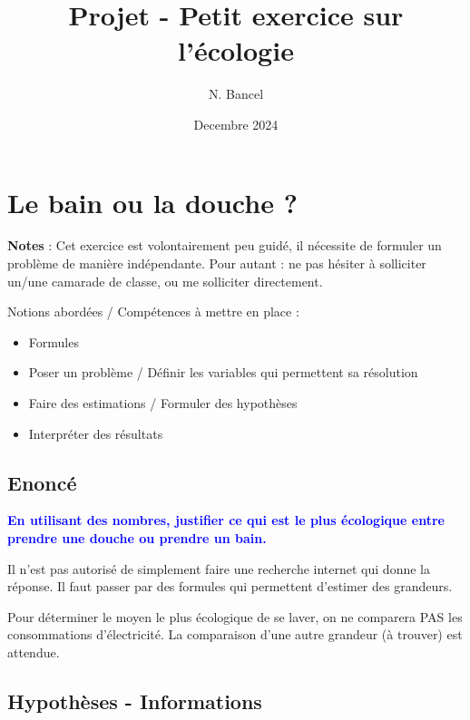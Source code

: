 \documentclass[a4paper,12pt]{article}
\begin{document}
\title{Projet - Petit exercice sur l'écologie}
\author{N. Bancel}
\date{Decembre 2024}
\maketitle

\section*{Le bain ou la douche ?}


\begin{tcolorbox}[colback=gray!30, colframe=black]
  \textbf{Notes} : Cet exercice est volontairement peu guidé, il nécessite de formuler un problème de manière indépendante. Pour autant : ne pas hésiter à solliciter un/une camarade de classe, ou me solliciter directement. \par
  \vspace{1em}
  Notions abordées / Compétences à mettre en place :
  \begin{itemize}[noitemsep]
    \item Formules
    \item Poser un problème / Définir les variables qui permettent sa résolution
    \item Faire des estimations / Formuler des hypothèses
    \item Interpréter des résultats
  \end{itemize}
  \end{tcolorbox}

\subsection*{Enoncé}

\textcolor{blue}{\textbf{En utilisant des nombres, justifier ce qui est le plus écologique entre prendre une douche ou prendre un bain.}} \par
\vspace{1em}
Il n'est pas autorisé de simplement faire une recherche internet qui donne la réponse. Il faut passer par des formules qui permettent d'estimer des grandeurs. \par
\vspace{1em}
Pour déterminer le moyen le plus écologique de se laver, on ne comparera PAS les consommations d'électricité. La comparaison d'une autre grandeur (à trouver) est attendue.

\subsection*{Hypothèses - Informations}
\end{document}
